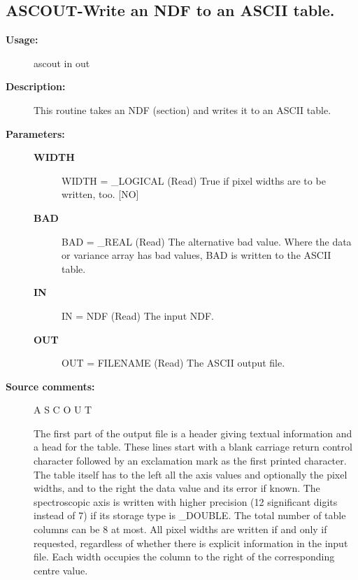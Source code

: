\subsection{ASCOUT-\label{ASCOUT}Write an NDF to an ASCII table.}
\begin{description}

\item [\textbf{Usage:}]

   ascout in out


\item [\textbf{Description:}]
   This routine takes an NDF (section) and writes it to an ASCII
   table.


\item [\textbf{Parameters:}]
\begin{description}
\item [\textbf{WIDTH}]
WIDTH = \_LOGICAL (Read)
   True if pixel widths are to be written, too. [NO]
\item [\textbf{BAD}]
BAD = \_REAL (Read)
   The alternative bad value. Where the data or variance array has
   bad values, BAD is written to the ASCII table.
\item [\textbf{IN}]
IN = NDF (Read)
   The input NDF.
\item [\textbf{OUT}]
OUT = FILENAME (Read)
   The ASCII output file.

\end{description}

\item [\textbf{Source comments:}]
\begin{terminalv}
   A S C O U T

   The first part of the output file is a header giving
   textual information and a head for the table. These lines start
   with a blank carriage return control character followed by an
   exclamation mark as the first printed character. The table itself
   has to the left all the axis values and optionally the pixel
   widths, and to the right the data value and its error if known.
   The spectroscopic axis is written with higher precision (12
   significant digits instead of 7) if its storage type is \_DOUBLE.
   The total number of table columns can be 8 at most. All pixel
   widths are written if and only if requested, regardless of whether
   there is explicit information in the input file. Each width
   occupies the column to the right of the corresponding centre
   value.

\end{terminalv}


\end{description}
